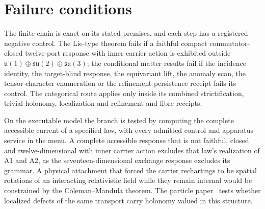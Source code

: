 \section{Failure conditions}
\label{sec:gauge-failure-conditions}

The finite chain is exact on its stated premises, and each step has a
registered negative control. The Lie-type theorem fails if a faithful
compact commutator-closed twelve-port response with inner carrier action is
exhibited outside
\(\mathfrak u(1)\oplus\mathfrak{su}(2)\oplus\mathfrak{su}(3)\); the
conditional matter results fail if the incidence identity, the target-blind
response, the equivariant lift, the anomaly scan, the tensor-character
enumeration or the refinement persistence receipt fails its control. The
categorical route applies only inside its combined strictification,
trivial-holonomy, localization and refinement and fibre receipts.

On the executable model the branch is tested by computing the complete
accessible current of a specified law, with every admitted control and
apparatus service in the menu. A complete accessible response that is not
faithful, closed and twelve-dimensional with inner carrier action excludes
that law's realization of A1 and A2, as the seventeen-dimensional exchange
response excludes its grammar. A physical attachment that forced the carrier
rechartings to be spatial rotations of an interacting relativistic field while
they remain internal would be constrained by the Coleman--Mandula theorem.
The particle paper~\cite{ophparticles} tests whether localized defects of the
same transport carry holonomy valued in this structure.
